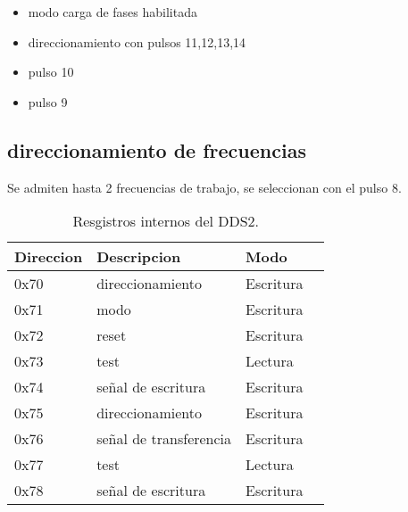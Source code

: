 \begin{itemize}
    \item modo carga de fases habilitada
    \item direccionamiento con pulsos 11,12,13,14
    \item pulso 10
    \item pulso 9
\end{itemize}

\subsection{direccionamiento de frecuencias}
Se admiten hasta 2 frecuencias de trabajo, se seleccionan con el pulso 8.




\begin{table}[ht]
    \centering
    \begin{tabular}{|l|l|l|l|}
    \hline
    Direccion  & Descripcion             & Modo      \\
    \hline
    0x70       & direccionamiento        & Escritura \\
    \hline
    0x71       & modo                    & Escritura \\
    \hline
    0x72       & reset                   & Escritura \\
    \hline
    0x73       & test                    & Lectura   \\
    \hline
    0x74       & se\~nal de escritura      & Escritura \\
    \hline
    0x75       & direccionamiento        & Escritura \\
    \hline
    0x76       & se\~nal de transferencia  & Escritura \\
    \hline
    0x77       & test                    & Lectura   \\
    \hline
    0x78       & se\~nal de escritura      & Escritura \\
    \hline
\end{tabular}
\caption{\label{tab:tableTestCases}Resgistros internos del DDS2.}
\end{table}


\newpage
